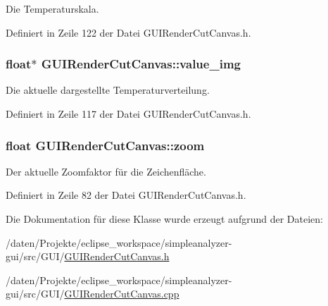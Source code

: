 Die Temperaturskala. 



Definiert in Zeile 122 der Datei G\-U\-I\-Render\-Cut\-Canvas.\-h.

\hypertarget{classGUIRenderCutCanvas_ad5a1f8cc7bd80e3c5a1fde354f0506b0}{
\subsubsection[{value\-\_\-img}]{\setlength{\rightskip}{0pt plus 5cm}float$\ast$ G\-U\-I\-Render\-Cut\-Canvas\-::value\-\_\-img\hspace{0.3cm}{\ttfamily [private]}}}\label{classGUIRenderCutCanvas_ad5a1f8cc7bd80e3c5a1fde354f0506b0}


Die aktuelle dargestellte Temperaturverteilung. 



Definiert in Zeile 117 der Datei G\-U\-I\-Render\-Cut\-Canvas.\-h.

\hypertarget{classGUIRenderCutCanvas_ac680bbbc673a6b336dcfc812c70a0779}{
\subsubsection[{zoom}]{\setlength{\rightskip}{0pt plus 5cm}float G\-U\-I\-Render\-Cut\-Canvas\-::zoom\hspace{0.3cm}{\ttfamily [private]}}}\label{classGUIRenderCutCanvas_ac680bbbc673a6b336dcfc812c70a0779}


Der aktuelle Zoomfaktor für die Zeichenfläche. 



Definiert in Zeile 82 der Datei G\-U\-I\-Render\-Cut\-Canvas.\-h.



Die Dokumentation für diese Klasse wurde erzeugt aufgrund der Dateien\-:\begin{DoxyCompactItemize}
\item 
/daten/\-Projekte/eclipse\-\_\-workspace/simpleanalyzer-\/gui/src/\-G\-U\-I/\hyperlink{GUIRenderCutCanvas_8h}{G\-U\-I\-Render\-Cut\-Canvas.\-h}\item 
/daten/\-Projekte/eclipse\-\_\-workspace/simpleanalyzer-\/gui/src/\-G\-U\-I/\hyperlink{GUIRenderCutCanvas_8cpp}{G\-U\-I\-Render\-Cut\-Canvas.\-cpp}\end{DoxyCompactItemize}
